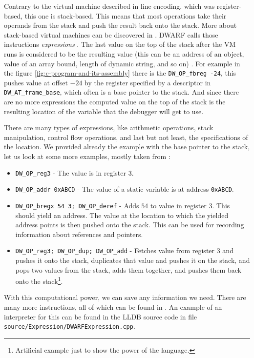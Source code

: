 Contrary to the virtual machine described in line encoding, which was
register-based, this one is stack-based. This means that most operations take
their operands from the stack and push the result back onto the stack. More
about stack-based virtual machines can be discovered in
\cite{crafting-interpreters}. DWARF calls those instructions
\textit{expressions} \cite{dwarf}. The last value on the top of the stack after
the VM runs is considered to be the resulting value (this can be an address of
an object, value of an array bound, length of dynamic string, and so on)
\cite{dwarf}. For example in the figure \ref{fig:c-program-and-its-assembly}
there is the \texttt{DW\_OP\_fbreg -24}, this pushes value at offset $-24$ by
the register specified by a descriptor in \texttt{DW\_AT\_frame\_base}, which
often is a base pointer to the stack. And since there are no more expressions
the computed value on the top of the stack is the resulting location of the
variable that the debugger will get to use.

There are many types of expressions, like arithmetic operations, stack
manipulation, control flow operations, and last but not least, the
specifications of the location. We provided already the example with the base
pointer to the stack, let us look at some more examples, mostly taken from
\cite{dwarf}:
\begin{itemize}
    \item \texttt{DW\_OP\_reg3} - The value is in register $3$.
    \item \texttt{DW\_OP\_addr 0xABCD} - The value of a static variable is at
        address \texttt{0xABCD}.
    \item \texttt{DW\_OP\_bregx 54 3; DW\_OP\_deref} - Adds $54$ to value in
        register $3$. This should yield an address. The value at the location
        to which the yielded address points is then pushed onto the stack. This
        can be used for recording information about references and pointers.
    \item \texttt{DW\_OP\_reg3; DW\_OP\_dup; DW\_OP\_add} - Fetches value from
        register $3$ and pushes it onto the stack, duplicates that value and
        pushes it on the stack, and pops two values from the stack, adds them
        together, and pushes them back onto the stack\footnote{Artificial
        example just to show the power of the language.}.
\end{itemize}
With this computational power, we can save any information we need. There are
many more instructions, all of which can be found in \cite{dwarf}. An example
of an interpreter for this can be found in the LLDB source code in file
\texttt{source/Expression/DWARFExpression.cpp}.

